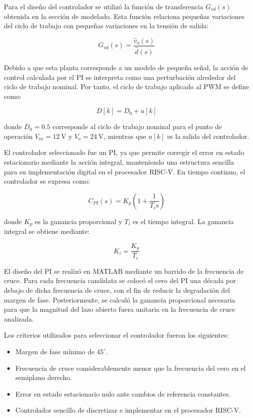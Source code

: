 \documentclass[conference]{IEEEtran}
\begin{document}
Para el diseño del controlador se utilizó la función de transferencia
$G_{vd}(s)$ obtenida en la sección de modelado. Esta función relaciona pequeñas variaciones del ciclo de trabajo con pequeñas variaciones en la tensión de salida:

\begin{equation}
    G_{vd}(s)=\frac{\hat{v}_o(s)}{\hat{d}(s)}
\end{equation}

Debido a que esta planta corresponde a un modelo de pequeña señal, la acción de control calculada por el PI se interpreta como una perturbación alrededor del ciclo de trabajo nominal. Por tanto, el ciclo de trabajo aplicado al PWM se define como:

\begin{equation}
    D[k]=D_0+u[k]
\end{equation}

donde $D_0=0.5$ corresponde al ciclo de trabajo nominal para el punto de operación $V_{in}=12~\mathrm{V}$ y $V_o=24~\mathrm{V}$, mientras que $u[k]$ es la salida del controlador.

El controlador seleccionado fue un PI, ya que permite corregir el error en estado estacionario mediante la acción integral, manteniendo una estructura sencilla para su implementación digital en el procesador RISC-V. En tiempo continuo, el controlador se expresa como:

\begin{equation}
    C_{PI}(s)=K_p\left(1+\frac{1}{T_i s}\right)
\end{equation}

donde $K_p$ es la ganancia proporcional y $T_i$ es el tiempo integral. La ganancia integral se obtiene mediante:

\begin{equation}
    K_i=\frac{K_p}{T_i}
\end{equation}

El diseño del PI se realizó en MATLAB mediante un barrido de la frecuencia de cruce. Para cada frecuencia candidata se colocó el cero del PI una década por debajo de dicha frecuencia de cruce, con el fin de reducir la degradación del margen de fase. Posteriormente, se calculó la ganancia proporcional necesaria para que la magnitud del lazo abierto fuera unitaria en la frecuencia de cruce analizada.

Los criterios utilizados para seleccionar el controlador fueron los siguientes:

\begin{itemize}
    \item Margen de fase mínimo de $45^\circ$.
    \item Frecuencia de cruce considerablemente menor que la frecuencia del cero
    en el semiplano derecho.
    \item Error en estado estacionario nulo ante cambios de referencia constantes.
    \item Controlador sencillo de discretizar e implementar en el procesador
    RISC-V.
\end{itemize}
\end{document}
